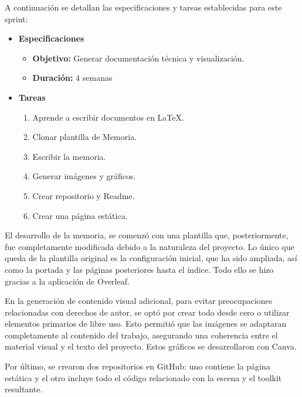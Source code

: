 \documentclass[a4paper, 12pt]{book}
\begin{document}
    A continuación se detallan las especificaciones y tareas establecidas para este sprint:
    
        \begin{itemize}
            \item \textbf{Especificaciones}
            \begin{itemize}
                \item \textbf{Objetivo:} Generar documentación técnica y visualización.
                \item \textbf{Duración:} 4 semanas

            \end{itemize}            
            \item \textbf{Tareas}
            \begin{enumerate}
                \item Aprende a escribir documentos en LaTeX.
                \item Clonar plantilla de Memoria.
                \item Escribir la memoria.
                \item Generar imágenes y gráficos.
                \item Crear repositorio y Readme.
                \item Crear una página estática.
            \end{enumerate}
         \end{itemize}
            El desarrollo de la memoria, se comenzó con una plantilla que, posteriormente, fue completamente modificada debido a la naturaleza del proyecto. Lo único que queda de la plantilla original es la configuración inicial, que ha sido ampliada, así como la portada y las páginas posteriores hasta el índice. Todo ello se hizo gracias a la aplicación de Overleaf.

            En la generación de contenido visual adicional, para evitar preocupaciones relacionadas con derechos de autor, se optó por crear todo desde cero o utilizar elementos primarios de libre uso. Esto permitió que las imágenes se adaptaran completamente al contenido del trabajo, asegurando una coherencia entre el material visual y el texto del proyecto. Estos gráficos se desarrollaron con Canva.

            Por último, se crearon dos repositorios en GitHub: uno contiene la página estática y el otro incluye todo el código relacionado con la escena y el toolkit resultante.
            
\end{document}
